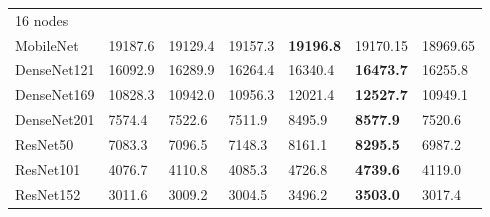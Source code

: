 \begin{table}
\begin{tabular}{lllllll}
    16 nodes    & ~         & ~            & ~       & ~       & ~       & ~       \\
    MobileNet   &    19187.6 &    19129.4   &    19157.3 &    \textbf{19196.8} &    19170.15 &    18969.65 \\
    DenseNet121 & 16092.9   & 16289.9      & 16264.4 & 16340.4 & \textbf{16473.7} & 16255.8 \\
    DenseNet169 & 10828.3   & 10942.0        & 10956.3 & 12021.4 & \textbf{12527.7} & 10949.1 \\
    DenseNet201 & 7574.4    & 7522.6       & 7511.9  & 8495.9  & \textbf{8577.9}  & 7520.6  \\
    ResNet50    & 7083.3    & 7096.5       & 7148.3  & 8161.1  & \textbf{8295.5}  & 6987.2  \\
    ResNet101   & 4076.7    & 4110.8       & 4085.3  & 4726.8  & \textbf{4739.6}  & 4119.0    \\
    ResNet152   & 3011.6    & 3009.2       & 3004.5  & 3496.2  & \textbf{3503.0}    & 3017.4  \\
    \end{tabular}
    \label{tbl:pap_hvd_beluga_full}
\end{table}